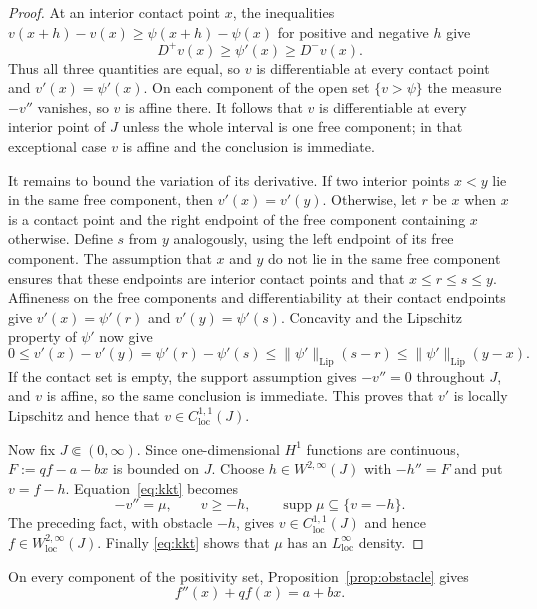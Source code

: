 \documentclass[11pt]{article}
\theoremstyle{definition}
\theoremstyle{remark}
\begin{document}
\begin{proof}
At an interior contact point $x$, the inequalities
$v(x+h)-v(x)\geq\psi(x+h)-\psi(x)$ for positive and negative $h$ give
\[
 D^+v(x)\geq\psi'(x)\geq D^-v(x).
\]
Thus all three quantities are equal, so $v$ is differentiable at every
contact point and $v'(x)=\psi'(x)$. On each component of the open set
$\{v>\psi\}$ the measure $-v''$ vanishes, so $v$ is affine there. It follows
that $v$ is differentiable at every interior point of $J$ unless the whole
interval is one free component; in that exceptional case $v$ is affine and
the conclusion is immediate.

It remains to bound the variation of its derivative. If two interior points
$x<y$ lie in the same free component, then $v'(x)=v'(y)$. Otherwise, let $r$
be $x$ when $x$ is a contact point and the right endpoint of the free
component containing $x$ otherwise. Define $s$ from $y$ analogously, using
the left endpoint of its free component. The assumption that $x$ and $y$ do
not lie in the same free component ensures that these endpoints are interior
contact points and that
$x\leq r\leq s\leq y$. Affineness on the free components and differentiability
at their contact endpoints give
$v'(x)=\psi'(r)$ and $v'(y)=\psi'(s)$. Concavity and the Lipschitz property of
$\psi'$ now give
\[
 0\leq v'(x)-v'(y)
 = \psi'(r)-\psi'(s)
 \leq \|\psi'\|_{\mathrm{Lip}}(s-r)
 \leq \|\psi'\|_{\mathrm{Lip}}(y-x).
\]
If the contact set is empty, the support assumption gives
$-v''=0$ throughout $J$, and $v$ is affine, so the same conclusion is
immediate. This proves that $v'$ is locally Lipschitz and hence that
$v\in C^{1,1}_{\mathrm{loc}}(J)$.

Now fix $J\Subset(0,\infty)$. Since one-dimensional $H^1$ functions are
continuous, $F:=qf-a-bx$ is bounded on $J$. Choose
$h\in W^{2,\infty}(J)$ with $-h''=F$ and put $v=f-h$. Equation~\eqref{eq:kkt}
becomes
\[
 -v''=\mu,
 \qquad v\geq-h,
 \qquad \operatorname{supp}\mu\subseteq\{v=-h\}.
\]
The preceding fact, with obstacle $-h$, gives
$v\in C^{1,1}_{\mathrm{loc}}(J)$ and hence
$f\in W^{2,\infty}_{\mathrm{loc}}(J)$. Finally
\eqref{eq:kkt} shows that $\mu$ has an $L^\infty_{\mathrm{loc}}$ density.
\end{proof}

On every component of the positivity set, Proposition~\ref{prop:obstacle} gives
\begin{equation}\label{eq:ode}
 f''(x)+qf(x)=a+bx.
\end{equation}
\end{document}
